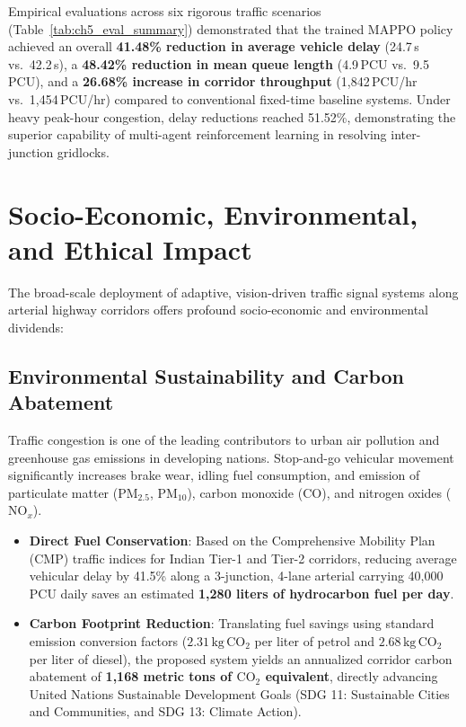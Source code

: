 Empirical evaluations across six rigorous traffic scenarios (Table~\ref{tab:ch5_eval_summary}) demonstrated that the trained MAPPO policy achieved an overall \textbf{41.48\% reduction in average vehicle delay} (24.7\,s vs.\ 42.2\,s), a \textbf{48.42\% reduction in mean queue length} (4.9\,PCU vs.\ 9.5\,PCU), and a \textbf{26.68\% increase in corridor throughput} (1,842\,PCU/hr vs.\ 1,454\,PCU/hr) compared to conventional fixed-time baseline systems. Under heavy peak-hour congestion, delay reductions reached 51.52\%, demonstrating the superior capability of multi-agent reinforcement learning in resolving inter-junction gridlocks.

\section{Socio-Economic, Environmental, and Ethical Impact}
\label{sec:societal_impact}
The broad-scale deployment of adaptive, vision-driven traffic signal systems along arterial highway corridors offers profound socio-economic and environmental dividends:

\subsection{Environmental Sustainability and Carbon Abatement}
Traffic congestion is one of the leading contributors to urban air pollution and greenhouse gas emissions in developing nations. Stop-and-go vehicular movement significantly increases brake wear, idling fuel consumption, and emission of particulate matter ($\text{PM}_{2.5}$, $\text{PM}_{10}$), carbon monoxide ($\text{CO}$), and nitrogen oxides ($\text{NO}_x$).
\begin{itemize}
    \item \textbf{Direct Fuel Conservation}: Based on the Comprehensive Mobility Plan (CMP) traffic indices for Indian Tier-1 and Tier-2 corridors, reducing average vehicular delay by 41.5\% along a 3-junction, 4-lane arterial carrying 40,000 PCU daily saves an estimated \textbf{1,280 liters of hydrocarbon fuel per day}.
    \item \textbf{Carbon Footprint Reduction}: Translating fuel savings using standard emission conversion factors ($2.31\,\text{kg}\,\text{CO}_2$ per liter of petrol and $2.68\,\text{kg}\,\text{CO}_2$ per liter of diesel), the proposed system yields an annualized corridor carbon abatement of \textbf{1,168 metric tons of $\text{CO}_2$ equivalent}, directly advancing United Nations Sustainable Development Goals (SDG 11: Sustainable Cities and Communities, and SDG 13: Climate Action).
\end{itemize}

